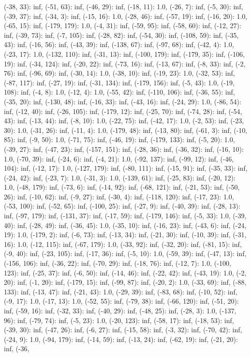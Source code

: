 \documentclass[parskip=half]{scrartcl}
\begin{document}
(-38, 33): inf, (-51, 63): inf, (-46, 29): inf, (-18, 11): 1.0, (-26, 7): inf, (-5, 30): inf, (-39, 37): inf, (-34, 3): inf, (-15, 16): 1.0, (-28, 46): inf, (-57, 19): inf, (-16, 20): 1.0, (-65, 15): inf, (-179, 179): 1.0, (-4, 31): inf, (-59, 95): inf, (-58, 60): inf, (-12, 27): inf, (-39, 73): inf, (-7, 105): inf, (-28, 82): inf, (-54, 30): inf, (-108, 59): inf, (-35, 43): inf, (-16, 56): inf, (-43, 39): inf, (-138, 67): inf, (-97, 68): inf, (-42, 4): 1.0, (-23, 17): 1.0, (-132, 110): inf, (-31, 13): inf, (-100, 179): inf, (-179, 35): inf, (-106, 19): inf, (-34, 124): inf, (-20, 22): inf, (-73, 16): inf, (-13, 67): inf, (-8, 33): inf, (-2, 76): inf, (-96, 69): inf, (-30, 14): 1.0, (-38, 10): inf, (-19, 23): 1.0, (-32, 53): inf, (-87, 117): inf, (-27, 19): inf, (-31, 134): inf, (-179, 156): inf, (-5, 43): 1.0, (-19, 108): inf, (-4, 8): 1.0, (-12, 4): 1.0, (-55, 42): inf, (-110, 106): inf, (-36, 55): inf, (-35, 20): inf, (-130, 48): inf, (-16, 33): inf, (-43, 16): inf, (-24, 29): 1.0, (-86, 54): inf, (-12, 40): inf, (-26, 105): inf, (-179, 12): inf, (-25, 70): inf, (-74, 28): inf, (-54, 43): inf, (-13, 44): inf, (-8, 10): 1.0, (-22, 75): inf, (-42, 17): 1.0, (-2, 53): inf, (-23, 30): 1.0, (-31, 26): inf, (-11, 4): 1.0, (-179, 48): inf, (-13, 80): inf, (-61, 3): inf, (-10, 85): inf, (-9, 50): 1.0, (-71, 75): inf, (-46, 19): inf, (-179, 133): inf, (-5, 20): 1.0, (-39, 27): inf, (-47, 23): inf, (-157, 151): inf, (-28, 36): inf, (-36, 32): inf, (-16, 10): 1.0, (-70, 39): inf, (-24, 6): inf, (-4, 21): 1.0, (-92, 137): inf, (-99, 12): inf, (-46, 104): inf, (-12, 17): 1.0, (-127, 179): inf, (-80, 111): inf, (-15, 91): inf, (-35, 33): inf, (-24, 42): inf, (-23, 7): 1.0, (-31, 3): 1.0, (-139, 61): inf, (-25, 83): inf, (-20, 12): 1.0, (-48, 179): inf, (-73, 6): inf, (-14, 92): inf, (-68, 121): inf, (-21, 53): inf, (-50, 26): inf, (-10, 62): inf, (-9, 27): inf, (-30, 4): inf, (-118, 120): inf, (-17, 23): 1.0, (-53, 100): inf, (-52, 65): inf, (-100, 25): inf, (-27, 9): inf, (-40, 39): inf, (-28, 13): inf, (-97, 179): inf, (-131, 37): inf, (-17, 59): inf, (-179, 146): inf, (-5, 33): 1.0, (-39, 40): inf, (-28, 49): inf, (-36, 45): 1.0, (-35, 10): inf, (-16, 23): inf, (-43, 6): inf, (-24, 19): 1.0, (-179, 2): inf, (-6, 73): inf, (-13, 34): inf, (-21, 30): inf, (-10, 39): inf, (-31, 16): 1.0, (-12, 115): inf, (-67, 179): 1.0, (-33, 92): inf, (-32, 20): inf, (-81, 15): inf, (-9, 40): inf, (-23, 105): inf, (-17, 36): inf, (-5, 10): 1.0, (-59, 39): inf, (-47, 13): inf, (-156, 106): inf, (-36, 22): inf, (-70, 29): inf, (-18, 76): inf, (-12, 7): 1.0, (-100, 123): inf, (-25, 37): inf, (-6, 50): inf, (-14, 46): inf, (-22, 42): inf, (-43, 19): 1.0, (-2, 20): inf, (-1, 20): inf, (-179, 15): inf, (-99, 87): inf, (-20, 2): 1.0, (-33, 69): inf, (-88, 133): inf, (-13, 47): inf, (-21, 43): 1.0, (-29, 39): inf, (-83, 68): inf, (-10, 52): inf, (-9, 17): 1.0, (-17, 13): 1.0, (-52, 55): inf, (-79, 38): inf, (-66, 120): inf, (-51, 20): inf, (-59, 16): inf, (-32, 33): inf, (-40, 29): inf, (-48, 25): inf, (-28, 3): 1.0, (-137, 96): inf, (-79, 74): inf, (-5, 23): 1.0, (-20, 123): inf, (-58, 17): inf, (-18, 53): inf, (-39, 30): inf, (-47, 26): inf, (-6, 27): inf, (-15, 58): inf, (-3, 32): inf, (-70, 42): inf, (-24, 9): 1.0, (-94, 179): inf, (-14, 59): inf, (-13, 24): inf, (-62, 19): inf, (-21, 20): inf, (-36, 
\end{document}
